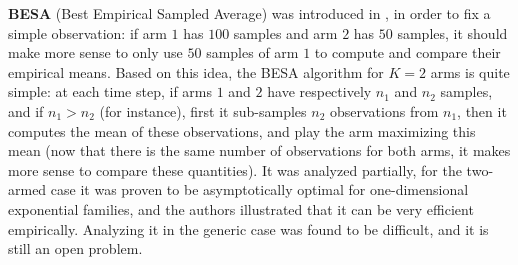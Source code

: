 \textbf{BESA} (Best Empirical Sampled Average) was introduced in \cite{Baransi2014}, in order to fix a simple observation:
if arm $1$ has $100$ samples and arm $2$ has $50$ samples, it should make more sense to only use $50$ samples of arm $1$ to compute and compare their empirical means.
Based on this idea, the BESA algorithm for $K=2$ arms is quite simple: at each time step, if arms $1$ and $2$ have respectively $n_1$ and $n_2$ samples, and if $n_1>n_2$ (for instance), first it sub-samples $n_2$ observations from $n_1$, then it computes the mean of these observations, and play the arm maximizing this mean (now that there is the same number of observations for both arms, it makes more sense to compare these quantities).
It was analyzed partially, for the two-armed case it was proven to be asymptotically optimal for one-dimensional exponential families, and the authors illustrated that it can be very efficient empirically.
Analyzing it in the generic case was found to be difficult, and it is still an open problem.


